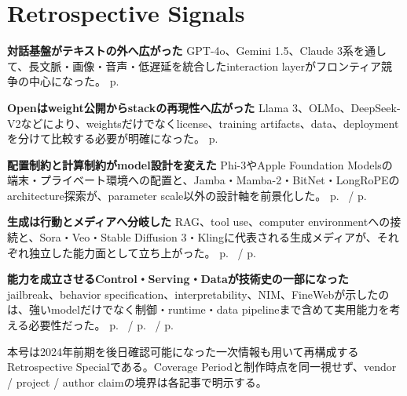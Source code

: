\section*{Retrospective Signals}
\smallskip
\noindent \textbf{対話基盤がテキストの外へ広がった} GPT-4o、Gemini 1.5、Claude 3系を通して、長文脈・画像・音声・低遅延を統合したinteraction layerがフロンティア競争の中心になった。 \hfill{\footnotesize p.~\pageref{pkg:frontier-interaction}}
\par
\smallskip
\noindent \textbf{Openはweight公開からstackの再現性へ広がった} Llama 3、OLMo、DeepSeek-V2などにより、weightsだけでなくlicense、training artifacts、data、deploymentを分けて比較する必要が明確になった。 \hfill{\footnotesize p.~\pageref{pkg:open-ecosystem}}
\par
\smallskip
\noindent \textbf{配置制約と計算制約がmodel設計を変えた} Phi-3やApple Foundation Modelsの端末・プライベート環境への配置と、Jamba・Mamba-2・BitNet・LongRoPEのarchitecture探索が、parameter scale以外の設計軸を前景化した。 \hfill{\footnotesize p.~\pageref{pkg:edge-private} / p.~\pageref{pkg:architecture-efficiency}}
\par
\smallskip
\noindent \textbf{生成は行動とメディアへ分岐した} RAG、tool use、computer environmentへの接続と、Sora・Veo・Stable Diffusion 3・Klingに代表される生成メディアが、それぞれ独立した能力面として立ち上がった。 \hfill{\footnotesize p.~\pageref{pkg:action-rag-agents} / p.~\pageref{pkg:generative-media}}
\par
\smallskip
\noindent \textbf{能力を成立させるControl・Serving・Dataが技術史の一部になった} jailbreak、behavior specification、interpretability、NIM、FineWebが示したのは、強いmodelだけでなく制御・runtime・data pipelineまで含めて実用能力を考える必要性だった。 \hfill{\footnotesize p.~\pageref{pkg:safety-control} / p.~\pageref{pkg:systems-data} / p.~\pageref{pkg:conclusion}}
\par
\medskip
\begin{claimboundary}
本号は2024年前期を後日確認可能になった一次情報も用いて再構成するRetrospective Specialである。Coverage Periodと制作時点を同一視せず、vendor / project / author claimの境界は各記事で明示する。
\end{claimboundary}
\medskip
\tableofcontents
